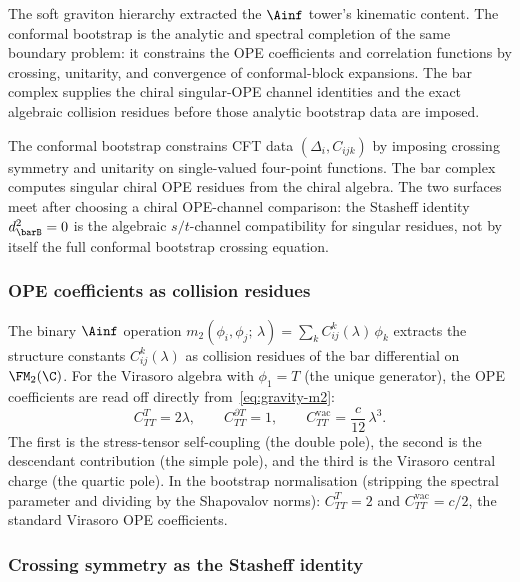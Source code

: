 The soft graviton hierarchy extracted the $\Ainf$ tower's
kinematic content. The conformal bootstrap is the analytic and
spectral completion of the same boundary problem: it constrains
the OPE coefficients and correlation functions by crossing,
unitarity, and convergence of conformal-block expansions. The bar
complex supplies the chiral singular-OPE channel identities and
the exact algebraic collision residues before those analytic
bootstrap data are imposed.

The conformal bootstrap constrains CFT data
$(\Delta_i, C_{ijk})$ by imposing crossing symmetry and unitarity
on single-valued four-point functions. The bar complex computes
singular chiral OPE residues from the chiral algebra. The two
surfaces meet after choosing a chiral OPE-channel comparison:
the Stasheff identity $d_{\barB}^2 = 0$ is the algebraic
$s/t$-channel compatibility for singular residues, not by itself
the full conformal bootstrap crossing equation.

\subsubsection*{OPE coefficients as collision residues}

The binary $\Ainf$ operation $m_2(\phi_i, \phi_j;\,\lambda)
= \sum_k C^k_{ij}(\lambda)\,\phi_k$ extracts the structure
constants $C^k_{ij}(\lambda)$ as collision residues of the bar
differential on $\FM_2(\C)$. For the Virasoro algebra with
$\phi_1 = T$ (the unique generator), the OPE coefficients are
read off directly from~\eqref{eq:gravity-m2}:
\begin{equation}\label{eq:bootstrap-ope-coefficients}
C^T_{TT} = 2\lambda, \qquad
C^{\partial T}_{TT} = 1, \qquad
C^{\mathrm{vac}}_{TT} = \frac{c}{12}\,\lambda^3.
\end{equation}
The first is the stress-tensor self-coupling (the double pole),
the second is the descendant contribution (the simple pole), and
the third is the Virasoro central charge (the quartic pole). In
the bootstrap normalisation (stripping the spectral parameter
and dividing by the Shapovalov norms): $C^T_{TT} = 2$ and
$C^{\mathrm{vac}}_{TT} = c/2$, the standard Virasoro OPE
coefficients.

\subsubsection*{Crossing symmetry as the Stasheff identity}

